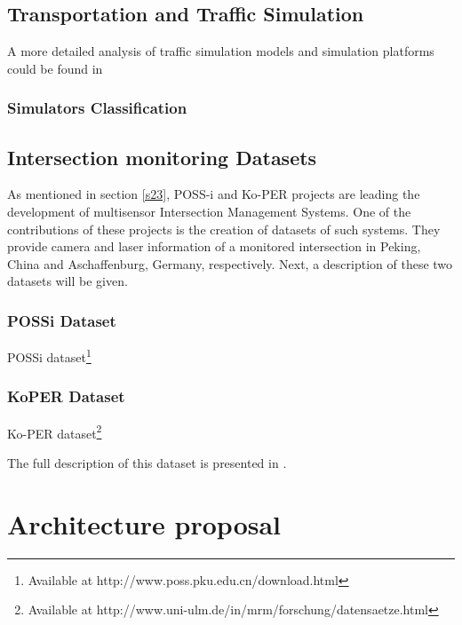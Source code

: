 \subsection{Transportation and Traffic Simulation}

A more detailed analysis of traffic simulation models and simulation platforms could be found in \cite{AdamsBoxill2000, Barcelo2000, Kitamura2005, Lieberman1992}
\subsubsection{Simulators Classification}
\subsection{Intersection monitoring Datasets}

As mentioned in section \ref{s23}, POSS-i and Ko-PER projects are leading the development of multisensor Intersection Management Systems. One of the contributions of these projects is the creation of datasets of such systems. They provide camera and laser information of a monitored intersection in Peking, China and Aschaffenburg, Germany, respectively. Next, a description of these two datasets will be given.

\subsubsection{POSSi Dataset }

POSSi dataset\footnote{Available at http://www.poss.pku.edu.cn/download.html}
\subsubsection{KoPER Dataset }

Ko-PER dataset\footnote{Available at http://www.uni-ulm.de/in/mrm/forschung/datensaetze.html}

The full description of this dataset is presented in \cite{Strigel2014}.

\section{Architecture proposal}